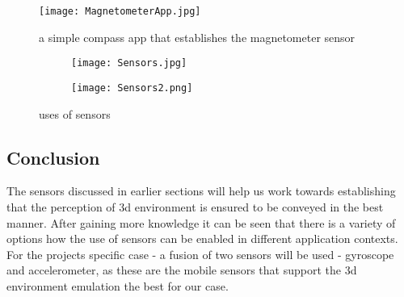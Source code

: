 





\begin{figure}[H]
\centering
\texttt{[image: MagnetometerApp.jpg]}
\caption{a simple compass app that establishes the magnetometer sensor}
\end{figure}




\begin{figure}[H]
\begin{subfigure}{.5\textwidth}
  \centering
  \texttt{[image: Sensors.jpg]}
\end{subfigure}%
\begin{subfigure}{.5\textwidth}
  \centering
  \texttt{[image: Sensors2.png]}
\end{subfigure}
\caption{uses of sensors}
\end{figure}


\subsection{Conclusion}
The sensors discussed in earlier sections will help us work towards establishing that the perception of 3d environment is ensured to be conveyed in the best manner. After gaining more knowledge it can be seen that there is a variety of options how the use of sensors can be enabled in different application contexts. For the projects specific case - a fusion of two sensors will be used - gyroscope and accelerometer, as these are the mobile sensors that support the 3d environment emulation the best for our case.